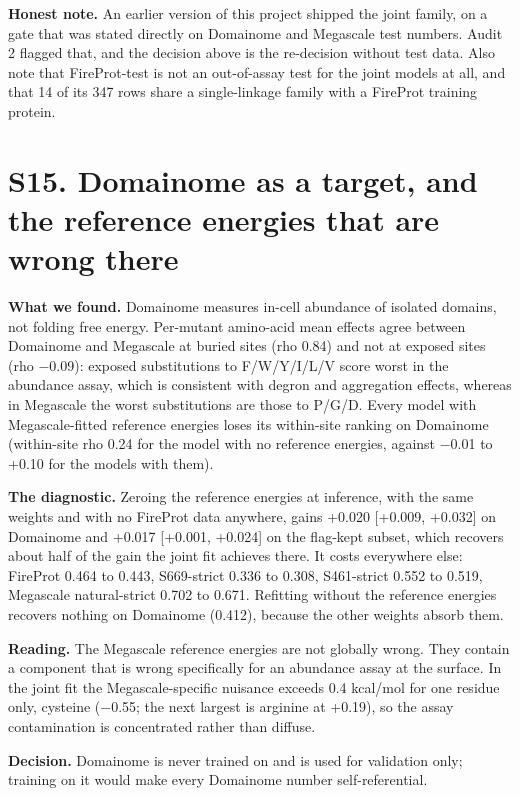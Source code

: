 \documentclass[11pt,a4paper]{article}
\begin{document}
\textbf{Honest note.} An earlier version of this project shipped the joint family, on a gate that was stated
directly on Domainome and Megascale test numbers. Audit 2 flagged that, and the decision above is the
re-decision without test data. Also note that FireProt-test is not an out-of-assay test for the joint models at
all, and that 14 of its 347 rows share a single-linkage family with a FireProt training protein.



\section{S15. Domainome as a target, and the reference energies that are wrong there}

\textbf{What we found.} Domainome measures in-cell abundance of isolated domains, not folding free energy. Per-mutant
amino-acid mean effects agree between Domainome and Megascale at buried sites (rho 0.84) and not at exposed
sites (rho $-$0.09): exposed substitutions to F/W/Y/I/L/V score worst in the abundance assay, which is consistent with
degron and aggregation effects, whereas in Megascale the worst substitutions are those to P/G/D. Every model with
Megascale-fitted reference energies loses its within-site ranking on Domainome (within-site rho 0.24 for the
model with no reference energies, against $-$0.01 to +0.10 for the models with them).

\textbf{The diagnostic.} Zeroing the reference energies at inference, with the same weights and with no FireProt data
anywhere, gains +0.020 [+0.009, +0.032] on Domainome and +0.017 [+0.001, +0.024] on the flag-kept subset, which
recovers about half of the gain the joint fit achieves there. It costs everywhere else: FireProt 0.464 to 0.443,
S669-strict 0.336 to 0.308, S461-strict 0.552 to 0.519, Megascale natural-strict 0.702 to 0.671. Refitting
without the reference energies recovers nothing on Domainome (0.412), because the other weights absorb them.

\textbf{Reading.} The Megascale reference energies are not globally wrong. They contain a component that is wrong
specifically for an abundance assay at the surface. In the joint fit the Megascale-specific nuisance exceeds
0.4 kcal/mol for one residue only, cysteine ($-$0.55; the next largest is arginine at +0.19), so the assay
contamination is concentrated rather than diffuse.

\textbf{Decision.} Domainome is never trained on and is used for validation only; training on it would make every
Domainome number self-referential.
\end{document}
